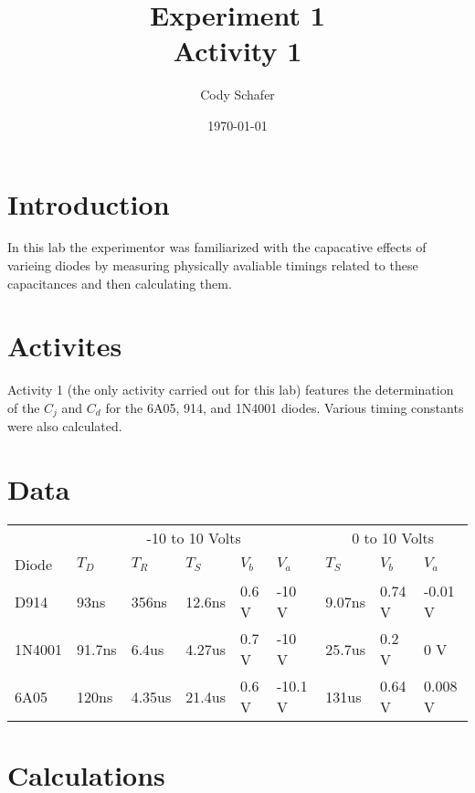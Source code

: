 \documentclass[dvips,10pt]{report}
\title{\textbf{Experiment 1} \\
	Activity 1}
\author{Cody Schafer}
\date{\today}
\begin{document}
\maketitle

\section{Introduction}

In this lab the experimentor was familiarized with the capacative effects
of varieing diodes by measuring physically avaliable timings related to
these capacitances and then calculating them.

\section{Activites}
Activity 1 (the only activity carried out for this lab) features the
determination of the $C_j$ and $C_d$ for the 6A05, 914, and 1N4001 diodes.
Various timing constants were also calculated.

\section{Data}

\begin{center}
\begin{tabularx}{\textwidth}{X|X|X|X|X|X|X|X|X}
	~ & 
	\multicolumn{5}{c|}{ -10 to 10 Volts} & 
	\multicolumn{3}{c}{ 0 to 10 Volts} \\

	Diode  & $T_D$  & $T_R$  & $T_S$ & $V_b$  & $V_a$   & $T_S$ & $V_b$
	& $V_a$ \\ \hline

	D914   & 93ns   & 356ns  & 12.6ns & 0.6 V & -10 V   & 9.07ns & 0.74
	V & -0.01 V \\

	1N4001 & 91.7ns & 6.4us  & 4.27us & 0.7 V & -10 V   & 25.7us & 0.2
	V & 0 V \\

	6A05   & 120ns  & 4.35us & 21.4us & 0.6 V & -10.1 V & 131us & 0.64
	V & 0.008 V \\
\end{tabularx}
\end{center}

\section{Calculations}
\end{document}
